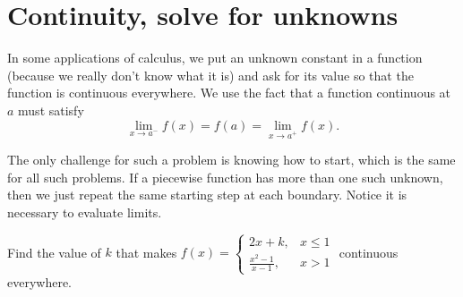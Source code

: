 \documentclass[../main.tex]{subfiles}
\begin{document}
 \section{Continuity, solve for unknowns} \label{sec:solve-for-unknowns}
In some applications of calculus, we put an unknown constant in a function (because we really don't know what it is) and ask for its value so that the function is continuous everywhere. We use the fact that a function continuous at \(a\) must satisfy
\[
  \lim_{x \to a^{-}} f(x) = f(a) = \lim_{x \to a^{+}} f(x).
\]

The only challenge for such a problem is knowing how to start, which is the same for all such problems. If a piecewise function has more than one such unknown, then we just repeat the same starting step at each boundary. Notice it is necessary to evaluate limits.

\begin{example} \label{eg:continuity-solve-simple}
  Find the value of \(k\) that makes
  \(
  f(x) =
  \begin{cases}
    2x + k, &x \le 1 \\
    \frac{x^{2}-1}{x-1},  &x > 1
  \end{cases}
  \)
  continuous everywhere.

  \blanks*
\end{example}
\end{document}
